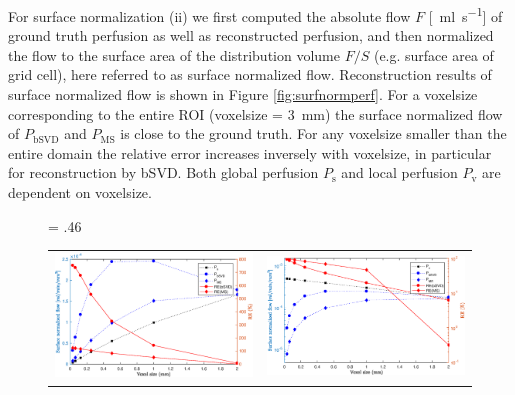\documentclass[final,5p,times,twocolumn]{elsarticle}
\begin{document}
For surface normalization (ii) we first computed the absolute flow $F$ [\SI{}{\milli\litre\per\second}] of ground truth perfusion as well as reconstructed perfusion, and then normalized the flow to the surface area of the distribution volume $F/S$ (e.g. surface area of grid cell), here referred to as surface normalized flow. 
Reconstruction results of surface normalized flow is shown in Figure \ref{fig:surfnormperf}. For a voxelsize corresponding to the entire ROI (voxelsize = \SI{3}{\milli\meter}) the surface normalized flow of $P_{\mathrm{bSVD}}$ and $P_{\mathrm{MS}}$ is close to the ground truth. For any voxelsize smaller than the entire domain the relative error increases inversely with voxelsize, in particular for reconstruction by bSVD. Both global perfusion $P_{\mathrm{s}}$ and local perfusion $P_{\mathrm{v}}$ are dependent on voxelsize.
    \begin{figure}[!htb]
    	\centering
    	\fwd = .46\textwidth
    	\begin{tabular}{c c}
    		\includegraphics[width=\fwd]{figs/E110_CBFOnDifferentResolutions_plot-Ps-scaleto-S.eps} & \includegraphics[width=\fwd]{figs/E110_CBFOnDifferentResolutions_plot-Pv-scaleto-S.eps}\\	

\end{tabular}
\end{figure}
\end{document}
